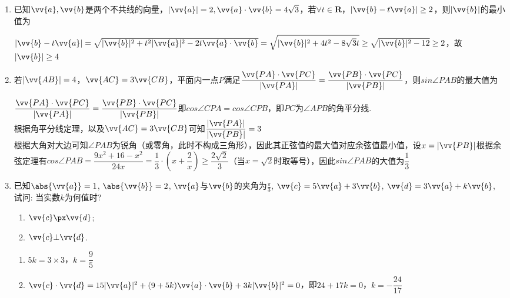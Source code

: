 \begin{enumerate}
    \item 已知$\vv{a}, \vv{b}$是两个不共线的向量，$|\vv{a}| = 2, \vv{a} \cdot \vv{b} = 4\sqrt{3}$，若$\forall t \in \mathbf{R}$，$|\vv{b} - t \vv{a}| \geq 2$，则$|\vv{b}|$的最小值为
    \begin{jieda}
        $|\vv{b} - t \vv{a}| = \sqrt{|\vv{b}|^2 + t^2|\vv{a}|^2 - 2t\vv{a} \cdot \vv{b}} = \sqrt{|\vv{b}|^2 + 4t^2 - 8\sqrt{3}t} \geq \sqrt{|\vv{b}|^2 -12} \geq 2$，故$|\vv{b}| \geq 4$
    \end{jieda}
    \item 若$|\vv{AB}| = 4$，$\vv{AC} = 3\vv{CB}$，平面内一点$P$满足$\dfrac{\vv{PA} \cdot \vv{PC}}{|\vv{PA}|} = \dfrac{\vv{PB} \cdot \vv{PC}}{|\vv{PB}|}$，则$sin\angle PAB$的最大值为
    \begin{jieda}
        $\dfrac{\vv{PA} \cdot \vv{PC}}{|\vv{PA}|} = \dfrac{\vv{PB} \cdot \vv{PC}}{|\vv{PB}|}$即$cos\angle CPA = cos\angle CPB$，即$PC$为$\angle APB$的角平分线. \\
        根据角平分线定理，以及$\vv{AC} = 3\vv{CB}$可知$\dfrac{|\vv{PA}|}{|\vv{PB}|} = 3$ \\
        根据大角对大边可知$\angle PAB$为锐角（或零角，此时不构成三角形），因此其正弦值的最大值对应余弦值最小值，设$x = |\vv{PB}|$根据余弦定理有$cos\angle PAB = \dfrac{9x^2 + 16 - x^2}{24x} = \dfrac{1}{3} \cdot \left(x + \dfrac{2}{x}\right) \geq \dfrac{2\sqrt{2}}{3}$（当$x = \sqrt{2}$时取等号），因此$sin\angle PAB$的大值为$\dfrac{1}{3}$
    \end{jieda}
    
    \item 已知$\abs{\vv{a}}=1$, $\abs{\vv{b}}=2$, $\vv{a}$与$\vv{b}$的夹角为$\frac{\pi}{3}$, $\vv{c}=5\vv{a}+3\vv{b}$, $\vv{d}=3\vv{a}+k\vv{b}$, 
    试问: 当实数$k$为何值时? 
    \begin{enumerate}[(1)]
    \item $\vv{c}\px\vv{d}$; 
    \item $\vv{c}\bot\vv{d}$. 
    \end{enumerate}
    \begin{jieda}
        \begin{enumerate}
            \item $5k = 3\times3$，$k = \dfrac{9}{5}$
            \item $\vv{c} \cdot \vv{d} = 15|\vv{a}|^2 + (9+5k)\vv{a}\cdot\vv{b}+3k|\vv{b}|^2 = 0$，即$24 + 17k = 0$，$k = -\dfrac{24}{17}$
        \end{enumerate}
    \end{jieda}
    

\end{enumerate}
